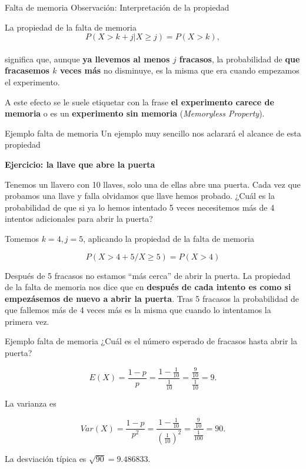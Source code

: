 \documentclass[
  ignorenonframetext,
  aspectratio=169]{beamer}
\begin{document}
\begin{frame}{Falta de memoria}
\protect\hypertarget{falta-de-memoria}{}
Observación: Interpretación de la propiedad

La propiedad de la falta de memoria \[
P(X> k+j\big|X \geq j)=P(X > k),
\]\\
significa que, aunque \textbf{ya llevemos al menos \(j\) fracasos}, la
probabilidad de \textbf{que fracasemos \(k\) veces más} no disminuye, es
la misma que era cuando empezamos el experimento.

A este efecto se le suele etiquetar con la frase \textbf{el experimento
carece de memoria} o es un \textbf{experimento sin memoria}
(\emph{Memoryless Property}).
\end{frame}

\begin{frame}{Ejemplo falta de memoria}
\protect\hypertarget{ejemplo-falta-de-memoria}{}
Un ejemplo muy sencillo nos aclarará el alcance de esta propiedad

\textbf{Ejercicio: la llave que abre la puerta}

Tenemos un llavero con 10 llaves, solo una de ellas abre una puerta.
Cada vez que probamos una llave y falla olvidamos que llave hemos
probado. ¿Cuál es la probabilidad de que si ya lo hemos intentado 5
veces necesitemos más de 4 intentos adicionales para abrir la puerta?

Tomemos \(k=4,j=5\), aplicando la propiedad de la falta de memoria

\[
P(X> 4+5/X \geq 5)=P(X > 4)
\]

Después de 5 fracasos no estamos ``más cerca'' de abrir la puerta. La
propiedad de la falta de memoria nos dice que en \textbf{después de cada
intento es como si empezásemos de nuevo a abrir la puerta}. Tras 5
fracasos la probabilidad de que fallemos más de 4 veces más es la misma
que cuando lo intentamos la primera vez.
\end{frame}

\begin{frame}{Ejemplo falta de memoria}
\protect\hypertarget{ejemplo-falta-de-memoria-1}{}
¿Cuál es el número esperado de fracasos hasta abrir la puerta?

\[
E(X)=\frac{1-p}{p}=\frac{1-\frac{1}{10}}{\frac{1}{10}}=\frac{\frac{9}{10}}{\frac{1}{10}}=9.
\]

La varianza es

\[
Var(X)=\frac{1-p}{p^2}=\frac{1-\frac{1}{10}}{\left(\frac{1}{10}\right)^2}=\frac{\frac{9}{10}}{\frac{1}{100}}=
90.
\]

La desviación típica es \(\sqrt{90}=9.486833.\)
\end{frame}
\end{document}
